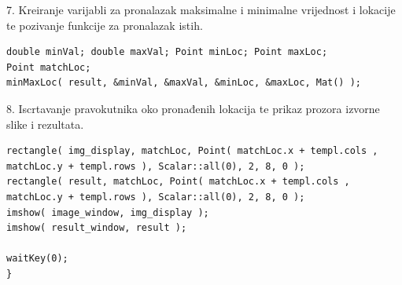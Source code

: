7. Kreiranje varijabli za pronalazak maksimalne i minimalne vrijednost i
lokacije te pozivanje funkcije za pronalazak istih.
\begin{lstlisting}[caption={}]
double minVal; double maxVal; Point minLoc; Point maxLoc;
Point matchLoc;
minMaxLoc( result, &minVal, &maxVal, &minLoc, &maxLoc, Mat() );
\end{lstlisting}

8. Iscrtavanje pravokutnika oko pronađenih lokacija te prikaz prozora
izvorne slike i rezultata.
\begin{lstlisting}[caption={}]
rectangle( img_display, matchLoc, Point( matchLoc.x + templ.cols , matchLoc.y + templ.rows ), Scalar::all(0), 2, 8, 0 );
rectangle( result, matchLoc, Point( matchLoc.x + templ.cols , matchLoc.y + templ.rows ), Scalar::all(0), 2, 8, 0 );
imshow( image_window, img_display );
imshow( result_window, result );

waitKey(0);
}
\end{lstlisting}


